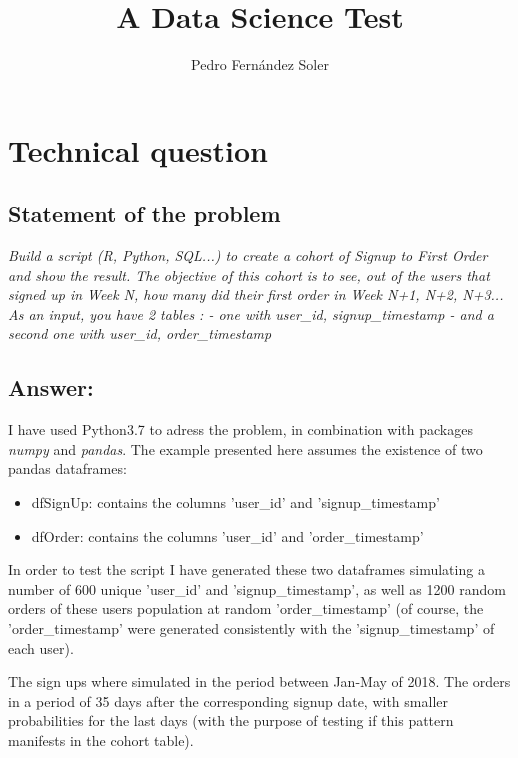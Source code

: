 \documentclass[12pt,aps,prd,amsmath,amssymb,floatfix,nofootinbib,reprint]{article}
\title{A Data Science Test}
\author{Pedro Fern\'andez Soler}
\begin{document}
\maketitle
% 
\tableofcontents
%
\section{Technical question}
%
\subsection{Statement of the problem}
\begin{center}
      \large
      \it
      Build a script (R, Python, SQL...) to create a cohort of Signup to First Order and show the
      result. The objective of this cohort is to see, out of the users that signed up in Week N, how
      many did their first order in Week N+1, N+2, N+3... As an input, you have 2 tables : - one with
      user\_id, signup\_timestamp - and a second one with user\_id, order\_timestamp 
\end{center}

\subsection{Answer:}

\lstset{language=Python}

I have used Python3.7 to adress the problem, 
in combination with packages \textit{numpy} and \textit{pandas}. 
The example presented here assumes the existence of two pandas dataframes:
\begin{itemize}
      \item dfSignUp: contains the columns 'user\_id' and 'signup\_timestamp'
      \item dfOrder: contains the columns 'user\_id' and 'order\_timestamp'
\end{itemize}

In order to test the script I have generated these two dataframes simulating 
a number of 600 unique 'user\_id' and 'signup\_timestamp', as well as
1200 random orders of these users population at random 'order\_timestamp' 
(of course, the 'order\_timestamp' were generated consistently with the
'signup\_timestamp' of each user). 

The sign ups where simulated in 
the period between Jan-May of 2018. The orders in a period of 35 days 
after the corresponding signup date, with smaller probabilities 
for the last days (with the purpose of testing if this pattern manifests
in the cohort table).\\
\end{document}

